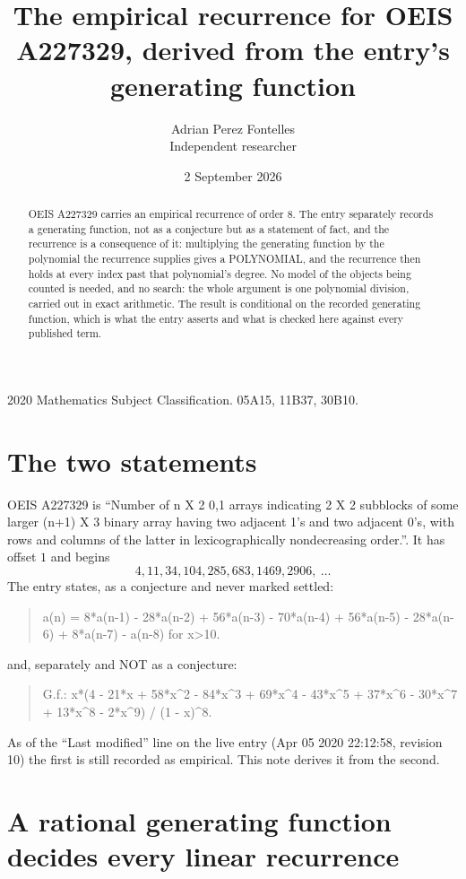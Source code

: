 \documentclass[11pt,a4paper]{article}
\title{The empirical recurrence for OEIS A227329, derived from the entry's generating function}
\author{Adrian Perez Fontelles\\ \small Independent researcher}
\date{2 September 2026}
\theoremstyle{plain}
\theoremstyle{definition}
\begin{document}
\maketitle

\begin{abstract}
OEIS A227329 carries an empirical recurrence of order $8$. The entry separately records a
generating function, not as a conjecture but as a statement of fact, and the recurrence is a
consequence of it: multiplying the generating function by the polynomial the recurrence
supplies gives a POLYNOMIAL, and the recurrence then holds at every index past that
polynomial's degree. No model of the objects being counted is needed, and no search: the
whole argument is one polynomial division, carried out in exact arithmetic. The result is
conditional on the recorded generating function, which is what the entry asserts and what is
checked here against every published term.
\end{abstract}

\noindent\small 2020 Mathematics Subject Classification. 05A15, 11B37, 30B10.\normalsize

\section{The two statements}

OEIS A227329 is ``Number of n X 2 0,1 arrays indicating 2 X 2 subblocks of some larger (n+1) X 3 binary array having two adjacent 1's and two adjacent 0's, with rows and columns of the latter in lexicographically nondecreasing order.''. It has offset $1$ and begins
\[
4, 11, 34, 104, 285, 683, 1469, 2906,\ \dots
\]
The entry states, as a conjecture and never marked settled:
\begin{quote}
a(n) = 8*a(n-1) - 28*a(n-2) + 56*a(n-3) - 70*a(n-4) + 56*a(n-5) - 28*a(n-6) + 8*a(n-7) - a(n-8) for x>10.
\end{quote}
and, separately and NOT as a conjecture:
\begin{quote}
G.f.: x*(4 - 21*x + 58*x\^{}2 - 84*x\^{}3 + 69*x\^{}4 - 43*x\^{}5 + 37*x\^{}6 - 30*x\^{}7 + 13*x\^{}8 - 2*x\^{}9) / (1 - x)\^{}8.
\end{quote}
As of the ``Last modified'' line on the live entry (Apr 05 2020 22:12:58, revision 10) the first is still
recorded as empirical. This note derives it from the second.

\section{A rational generating function decides every linear recurrence}
\end{document}

